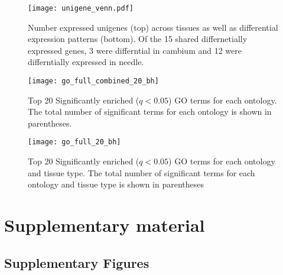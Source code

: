 \documentclass[11pt]{article}
\newcommand{\beginsupplement}{%
        \setcounter{table}{0}
        \renewcommand{\thetable}{S\arabic{table}}
        \setcounter{figure}{0}
        \renewcommand{\thefigure}{S\arabic{figure}}
        \renewcommand{\thesection}{S\arabic{section}}
        \renewcommand{\thesubsection}{S\arabic{subsection}} 
     }
\begin{document}

\clearpage

\singlespacing



\clearpage

\begin{figure}[t]
  \centering
  \texttt{[image: unigene\_venn.pdf]}
  \caption{Number expressed unigenes (top) across tissues as well as
    differential expression patterns (bottom). Of the 15 shared
    differnetially expressed genes, 3 were differntial in cambium and
    12 were differntially expressed in needle.}
  \label{fig:go_venn}
\end{figure}



\begin{figure}[t]
  \centering
  \texttt{[image: go\_full\_combined\_20\_bh]}
  \caption{Top 20 Significantly enriched ($q < 0.05$) GO terms for
    each ontology. The total number of significant terms for each
    ontology is shown in parentheses.}
  \label{fig:go_full_combined_20_bh}
\end{figure}


\begin{figure}[t]
  \centering
  \texttt{[image: go\_full\_20\_bh]}
  \caption{Top 20 Significantly enriched ($q < 0.05$) GO terms for
    each ontology and tissue type. The total number of significant
    terms for each ontology and tissue type is shown in parentheses}
  \label{fig:go_full_20_bh}
\end{figure}

\clearpage





\clearpage

\beginsupplement

\section*{Supplementary material}

\subsection*{Supplementary Figures}\label{ss:supp-fig}
\end{document}
